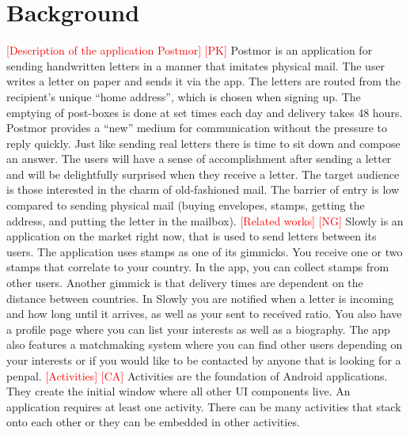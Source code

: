 \documentclass[acmlarge, review=false, screen=true]{acmart}
\begin{document}
  \section{Background}
    \textcolor{red}{[Description of the application Postmor] [PK]} \newline
    Postmor is an application for sending handwritten letters in a manner that imitates physical mail. The user writes a letter on paper and sends it via the app. The letters are routed from the recipient’s unique “home address”, which is chosen when signing up. The emptying of post-boxes is done at set times each day and delivery takes 48 hours. Postmor provides a “new” medium for communication without the pressure to reply quickly. Just like sending real letters there is time to sit down and compose an answer. The users will have a sense of accomplishment after sending a letter and will be delightfully surprised when they receive a letter. The target audience is those interested in the charm of old-fashioned mail. The barrier of entry is low compared to sending physical mail (buying envelopes, stamps, getting the address, and putting the letter in the mailbox).
\newline\newline
    \textcolor{red}{[Related works] [NG]} \newline
    Slowly is an application on the market right now, that is used to send letters between its users\cite{slowly}. The application uses stamps as one of its gimmicks. You receive one or two stamps that correlate to your country. In the app, you can collect stamps from other users. Another gimmick is that delivery times are dependent on the distance between countries. In Slowly you are notified when a letter is incoming and how long until it arrives, as well as your sent to received ratio. You also have a profile page where you can list your interests as well as a biography. The app also features a matchmaking system where you can find other users depending on your interests or if you would like to be contacted by anyone that is looking for a penpal.
\newline\newline
    \textcolor{red}{[Activities] [CA]} \newline
    Activities are the foundation of Android applications\cite{activity}. They create the initial window where all other UI components live. An application requires at least one activity. There can be many activities that stack onto each other or they can be embedded in other activities. 
\newline\newline
\end{document}
